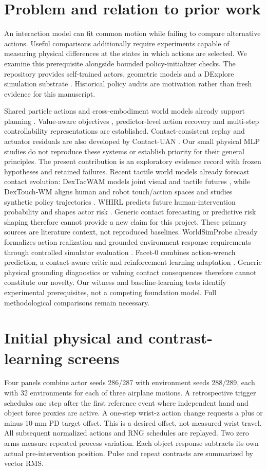 \documentclass[10 pt]{article}
\begin{document}
\section{Problem and relation to prior work}
An interaction model can fit common motion while failing to compare alternative actions.
Useful comparisons additionally require experiments capable of measuring physical
differences at the states in which actions are selected. We examine this prerequisite
alongside bounded policy-initializer checks. The repository provides self-trained
actors, geometric models and a DExplore simulation substrate \cite{xu2025}. Historical
policy audits are motivation rather than fresh evidence for this manuscript.

Shared particle actions and cross-embodiment world models already support planning
\cite{he2025}. Value-aware objectives \cite{farahmand2017}, predictor-level action
recovery \cite{qiu2026} and multi-step controllability representations \cite{rudolph2024}
are established. Contact-consistent replay and actuator residuals are also developed
by Contact-UAN \cite{fey2026}. Our small physical MLP studies do not reproduce these
systems or establish priority for their general principles. The present contribution
is an exploratory evidence record with frozen hypotheses and retained failures.
Recent tactile world models already forecast contact evolution: DexTacWAM models
joint visual and tactile futures \cite{yuan2026}, while DexTouch-WM aligns human
and robot touch/action spaces and studies synthetic policy trajectories
\cite{qin2026}. WHIRL predicts future human-intervention probability and shapes
actor risk \cite{yin2026}. Generic contact forecasting or predictive risk shaping
therefore cannot provide a new claim for this project. These primary sources
are literature context, not reproduced baselines.
WorldSimProbe already formalizes action realization and grounded environment
response requirements through controlled simulator evaluation \cite{co2026}.
Facet-0 combines action-wrench prediction, a contact-aware critic and reinforcement
learning adaptation \cite{deng2026}. Generic physical grounding diagnostics or
valuing contact consequences therefore cannot constitute our novelty. Our witness
and baseline-learning tests identify experimental prerequisites, not a competing
foundation model. Full methodological comparisons remain necessary.

\section{Initial physical and contrast-learning screens}
Four panels combine actor seeds 286/287 with environment seeds 288/289, each with
32 environments for each of three airplane motions. A retrospective trigger schedules
one step after the first reference event where independent hand and object force
proxies are active. A one-step wrist-z action change requests a plus or minus 10-mm
PD target offset. This is a desired offset, not measured wrist travel. All subsequent
normalized actions and RNG schedules are replayed. Two zero arms measure repeated
process variation. Each object response subtracts its own actual pre-intervention
position. Pulse and repeat contrasts are summarized by vector RMS.
\end{document}
